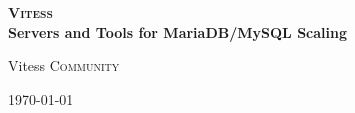 \begin{titlepage}
 
\begin{center}
 
 
\textsc{\huge \bfseries Vitess}\\[4.5cm]

 
 
 

{ \large  \bfseries Servers and Tools for MariaDB/MySQL Scaling}
\\[8.0cm]
 
 
\begin{minipage}{0.4\textwidth}
\begin{center} \large
Vitess \textsc{Community}
\end{center}
\end{minipage}
 
\vfill
{\large \today}
 
\end{center}
 
\end{titlepage}

